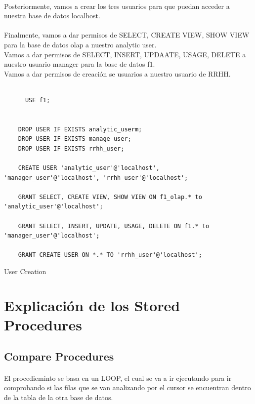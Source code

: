 \documentclass[a4paper 
,twoside
]{article}
\begin{document}
  \paragraph{}
  Posteriormente, vamos a crear los tres usuarios para que puedan acceder a nuestra base de datos localhost.

  \paragraph{}
  Finalmente, vamos a dar permisos de SELECT, CREATE VIEW, SHOW VIEW para la base de datos olap a nuestro analytic user.\\ Vamos a dar permisos de SELECT, INSERT, UPDAATE, USAGE, DELETE  a nuestro usuario manager para la base de datos f1.\\Vamos a dar permisos de creación se usuarios a nuestro usuario de RRHH.



  \begin{listing}[H]
    \begin{verbatim}

      USE f1;


    DROP USER IF EXISTS analytic_userm;
    DROP USER IF EXISTS manage_user;
    DROP USER IF EXISTS rrhh_user;

    CREATE USER 'analytic_user'@'localhost', 'manager_user'@'localhost', 'rrhh_user'@'localhost';

    GRANT SELECT, CREATE VIEW, SHOW VIEW ON f1_olap.* to 'analytic_user'@'localhost';

    GRANT SELECT, INSERT, UPDATE, USAGE, DELETE ON f1.* to 'manager_user'@'localhost';  

    GRANT CREATE USER ON *.* TO 'rrhh_user'@'localhost';

    \end{verbatim}
    \caption{User Creation}
    \label{lst:users}
  \end{listing}

\pagebreak
\section{Explicación de los Stored Procedures}
  \subsection{Compare Procedures}
  \paragraph{}
  El procedieminto se basa en un LOOP, el cual se va a ir ejecutando para ir comprobando si las filas que se van analizando por el cursor se encuentran dentro de la tabla de la otra base de datos. 
\end{document}
